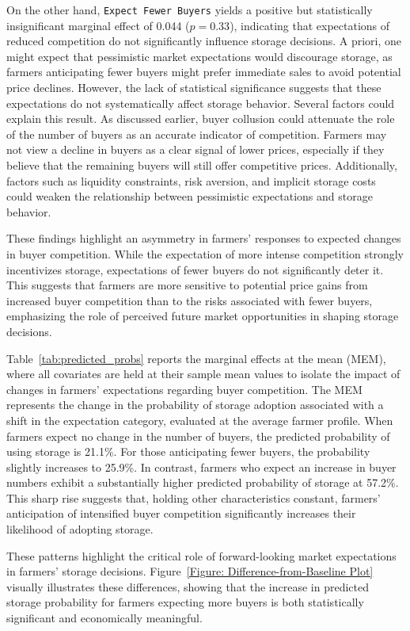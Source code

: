 On the other hand, \texttt{Expect Fewer Buyers} yields a positive but statistically insignificant marginal effect of 0.044 (\(p = 0.33\)), indicating that expectations of reduced competition do not significantly influence storage decisions. A priori, one might expect that pessimistic market expectations would discourage storage, as farmers anticipating fewer buyers might prefer immediate sales to avoid potential price declines. However, the lack of statistical significance suggests that these expectations do not systematically affect storage behavior. Several factors could explain this result. As discussed earlier, buyer collusion could attenuate the role of the number of buyers as an accurate indicator of competition. Farmers may not view a decline in buyers as a clear signal of lower prices, especially if they believe that the remaining buyers will still offer competitive prices. Additionally, factors such as liquidity constraints, risk aversion, and implicit storage costs could weaken the relationship between pessimistic expectations and storage behavior.

These findings highlight an asymmetry in farmers’ responses to expected changes in buyer competition. While the expectation of more intense competition strongly incentivizes storage, expectations of fewer buyers do not significantly deter it. This suggests that farmers are more sensitive to potential price gains from increased buyer competition than to the risks associated with fewer buyers, emphasizing the role of perceived future market opportunities in shaping storage decisions.

Table~\ref{tab:predicted_probs} reports the marginal effects at the mean (MEM), where all covariates are held at their sample mean values to isolate the impact of changes in farmers' expectations regarding buyer competition. The MEM represents the change in the probability of storage adoption associated with a shift in the expectation category, evaluated at the average farmer profile. When farmers expect no change in the number of buyers, the predicted probability of using storage is 21.1\%. For those anticipating fewer buyers, the probability slightly increases to 25.9\%. In contrast, farmers who expect an increase in buyer numbers exhibit a substantially higher predicted probability of storage at 57.2\%. This sharp rise suggests that, holding other characteristics constant, farmers' anticipation of intensified buyer competition significantly increases their likelihood of adopting storage.

These patterns highlight the critical role of forward-looking market expectations in farmers’ storage decisions. Figure~\ref{Figure: Difference-from-Baseline Plot} visually illustrates these differences, showing that the increase in predicted storage probability for farmers expecting more buyers is both statistically significant and economically meaningful.

